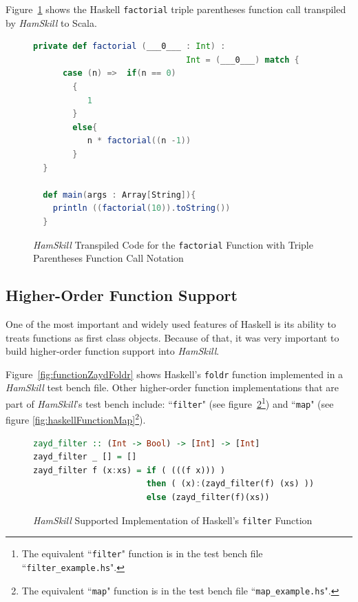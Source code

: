 \documentclass{report}
\begin{document}
Figure~\ref{fig:scalaFunctionFactorial} shows the Haskell \texttt{factorial} triple parentheses function call transpiled by \textit{HamSkill} to Scala.

\begin{figure}[H]
\begin{mdframed}
\begin{lstlisting}[language=Scala]
  private def factorial (___0___ : Int) :
                               Int = (___0___) match {
      case (n) =>  if(n == 0)
        {
           1
        }
        else{
           n * factorial((n -1))
        }
  } 
  
  def main(args : Array[String]){
    println ((factorial(10)).toString())
  } 
\end{lstlisting}
\end{mdframed}
\caption{\textit{HamSkill} Transpiled Code for the \texttt{factorial} Function with Triple Parentheses Function Call Notation}\label{fig:scalaFunctionFactorial}
\end{figure}

\subsection{Higher-Order Function Support}\label{sec:higherOrderFunctions}

One of the most important and widely used features of Haskell is its ability to treats functions as first class objects.  Because of that, it was very important to build higher-order function support into \textit{HamSkill}.

Figure~\ref{fig:functionZaydFoldr} shows Haskell's \texttt{foldr} function implemented in a \textit{HamSkill} test bench file.  Other higher-order function implementations that are part of \textit{HamSkill}'s test bench include: ``\texttt{filter}" (see figure~\ref{fig:haskellFunctionFilter}\footnote{The equivalent ``\texttt{filter}" function is in the test bench file ``\texttt{filter\_example.hs}".}) and ``\texttt{map}" (see figure \ref{fig:haskellFunctionMap}\footnote{The equivalent ``\texttt{map}" function is in the test bench file ``\texttt{map\_example.hs}".}).

\begin{figure}[H]
\begin{mdframed}
\begin{lstlisting}[language=Haskell, basicstyle=\small]
zayd_filter :: (Int -> Bool) -> [Int] -> [Int]
zayd_filter _ [] = []
zayd_filter f (x:xs) = if ( (((f x))) )
                       then ( (x):(zayd_filter(f) (xs) ))
                       else (zayd_filter(f)(xs))
\end{lstlisting}
\end{mdframed}
\caption{\textit{HamSkill} Supported Implementation of Haskell's \texttt{filter} Function}\label{fig:haskellFunctionFilter}
\end{figure}
\end{document}
